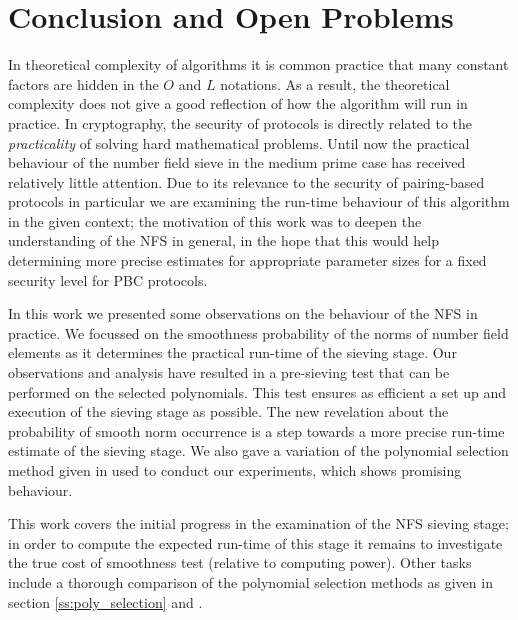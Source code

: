 \documentclass[a4paper, 10pt, envcountsect, runningheads]{lms}
\numberwithin{figure}{section}
\numberwithin{equation}{section}
\begin{document}
\section{Conclusion and Open Problems}
\label{s:conclusion}
In theoretical complexity of algorithms it is common practice that many constant factors are hidden in the $O$ and $L$ notations. As a result, the theoretical complexity does not give a good reflection of how the algorithm will run in practice.  
In cryptography, the security of protocols is directly related to the {\em practicality} of solving hard mathematical problems. Until now the practical behaviour of the number field sieve in the medium prime case has received relatively little attention. Due to its relevance to the security of pairing-based protocols in particular we are examining the run-time behaviour of this algorithm in the given context; the motivation of this work was to deepen the understanding of the NFS in general, in the hope that this would help determining more precise estimates for appropriate parameter sizes for a fixed security level for PBC protocols. 

In this work we presented some observations on the behaviour of the NFS in practice. We focussed on the smoothness probability of the norms of number field elements as it determines the practical run-time of the sieving stage. Our observations and analysis have resulted in a pre-sieving test that can be performed on the selected polynomials. This test ensures as efficient a set up and execution of the sieving stage as possible. The new revelation about the probability of smooth norm occurrence is a step towards a more precise run-time estimate of the sieving stage. We also gave a variation of the polynomial selection method given in \cite{joux-lercier-smart-vercauteren06} used to conduct our experiments, which shows promising behaviour.

This work covers the initial progress in the examination of the NFS sieving stage; in order to compute the expected run-time of this stage it remains to investigate the true cost of smoothness test (relative to computing power). Other tasks include a thorough comparison of the polynomial selection methods as given in section \ref{ss:poly_selection} and \cite{joux-lercier-smart-vercauteren06}. 




\newpage
\appendix
\end{document}
